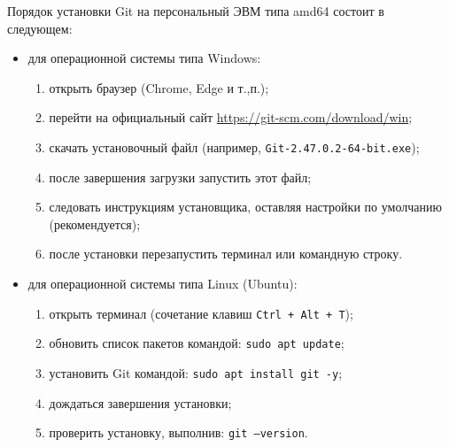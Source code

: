 Порядок установки Git на персональный ЭВМ типа amd64 состоит в следующем:
\begin{itemize}[beginpenalty=10000, midpenalty=10000, wide=\parindent, leftmargin=0pt]
	\item для операционной системы типа Windows:
	\begin{enumerate}[beginpenalty=10000, midpenalty=10000, wide=\parindent, leftmargin=0pt]
		\item открыть браузер (Chrome, Edge и т.,п.);
		\item перейти на официальный сайт \url{https://git-scm.com/download/win};
		\item скачать установочный файл (например, \texttt{Git-2.47.0.2-64-bit.exe});
		\item после завершения загрузки запустить этот файл;
		\item следовать инструкциям установщика, оставляя настройки по умолчанию (рекомендуется);
		\item после установки перезапустить терминал или командную строку.
	\end{enumerate}
	\item для операционной системы типа Linux (Ubuntu):
	\begin{enumerate}[beginpenalty=10000, midpenalty=10000, wide=\parindent, leftmargin=0pt]
		\item открыть терминал (сочетание клавиш \texttt{Ctrl + Alt + T});
		\item обновить список пакетов командой:
		\texttt{sudo apt update};
		\item установить Git командой:
		\texttt{sudo apt install git -y};
		\item дождаться завершения установки;
		\item проверить установку, выполнив:
		\texttt{git --version}.
	\end{enumerate}
\end{itemize}


